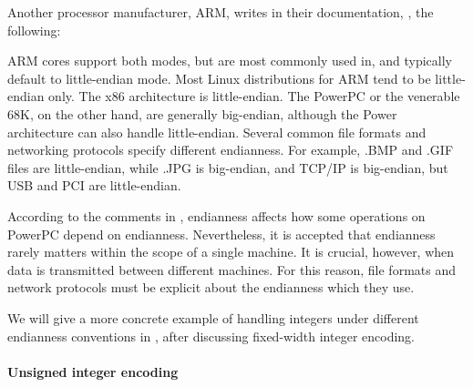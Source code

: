 \begin{remark}
  Another processor manufacturer, ARM, writes in their documentation, \cite{ARMDocs:endianness}, the following:
  \begin{displayquote}
    ARM cores support both modes, but are most commonly used in, and typically default to little-endian mode. Most Linux distributions for ARM tend to be little-endian only. The x86 architecture is little-endian. The PowerPC or the venerable 68K, on the other hand, are generally big-endian, although the Power architecture can also handle little-endian. Several common file formats and networking protocols specify different endianness. For example, .BMP and .GIF files are little-endian, while .JPG is big-endian, and TCP/IP is big-endian, but USB and PCI are little-endian.
  \end{displayquote}

  According to the comments in \cite{SO:bit_shift_endianness}, endianness affects how some operations on PowerPC depend on endianness. Nevertheless, it is accepted that endianness rarely matters within the scope of a single machine. It is crucial, however, when data is transmitted between different machines. For this reason, file formats and network protocols must be explicit about the endianness which they use.

  We will give a more concrete example of handling integers under different endianness conventions in , after discussing fixed-width integer encoding.
\end{remark}

\paragraph{Unsigned integer encoding}


